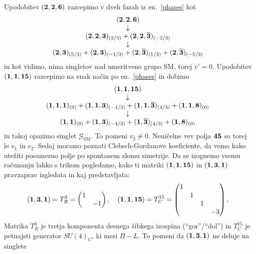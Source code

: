 \noindent Upodobitev $(\mathbf{2}, \mathbf{2}, \mathbf{6})$ razcepimo v dveh fazah iz en.~\eqref{phases} kot
\begin{align}
	\begin{array}{c}
		(\mathbf{2}, \mathbf{2}, \mathbf{6}) \\
		\downarrow \\
		(\mathbf{2}, \mathbf{2}, \mathbf{3})_{(2/3)} + (\mathbf{2}, \mathbf{2}, \overline{\mathbf{3}})_{(-2/3)} \\
		\downarrow \\
		(\mathbf{2}, \mathbf{3})_{(5/3)}+(\mathbf{2}, \mathbf{3})_{(-1/3)}+(\mathbf{2}, \overline{\mathbf{3}})_{(1/3)}+(\mathbf{2}, \overline{\mathbf{3}})_{(-5/3)}
	\end{array}
	\label{six:nosinglet}
\end{align}
in kot vidimo, nima singletov nad umeritveno grupo SM, torej $v' = 0$. Upodobitev $(\mathbf{1}, \mathbf{1}, \mathbf{15})$
razcepimo na enak način po en.~\eqref{phases} in dobimo
\begin{align}
	\begin{array}{c}
		(\mathbf{1}, \mathbf{1}, \mathbf{15}) \\
		\downarrow \\
		(\mathbf{1}, \mathbf{1}, \mathbf{1})_{(0)} + (\mathbf{1}, \mathbf{1}, \mathbf{3})_{(-4/3)} + (\mathbf{1}, \mathbf{1}, \overline{\mathbf{3}})_{(4/3)} +
			(\mathbf{1}, \mathbf{1}, \mathbf{8})_{(0)} \\
		\downarrow \\
		(\mathbf{1}, \mathbf{1})_{(0)} + (\mathbf{1}, \mathbf{3})_{(-4/3)} + (\mathbf{1}, \overline{\mathbf{3}})_{(4/3)} + (\mathbf{1}, \mathbf{8})_{(0)}
	\end{array}
\end{align}
in takoj opazimo singlet $\mathcal{G}_\text{SM}$. To pomeni $v_2 \neq 0$. Neničelne vev polja $\mathbf{45}$ so
torej le $v_1$ in $v_2$. Sedaj moramo poznati Clebsch-Gordanove koeficiente, da vemo kako utežiti posamezno
polje po spontanem zlomu simetrije. Da se izognemo vsemu računanju lahko s trikom pogledamo, kako ti matriki
$(\mathbf{1}, \mathbf{1}, \mathbf{15})$ in $(\mathbf{1}, \mathbf{3}, \mathbf{1})$ pravzaprav izgledata in kaj predstavljata:
\begin{equation}
	(\mathbf{1}, \mathbf{3}, \mathbf{1}) = T^3_R = \begin{pmatrix}
		1 & \\ & -1
	\end{pmatrix}, \quad (\mathbf{1}, \mathbf{1}, \mathbf{15}) = T_C^{15} = \begin{pmatrix}
		1 & & & \\
		& 1 & & \\
		& & 1 & \\
		& & &-3
	\end{pmatrix},
\end{equation}
Matrika $T^3_R$ je tretja komponenta desnega šibkega izospina ("`gor"'/"`dol"') in $T^{15}_C$ je
petnajsti generator $SU(4)_C$, ki meri $B-L$. To pomeni da $(\mathbf{1}, \mathbf{3}, \mathbf{1})$ ne deluje na singlete
